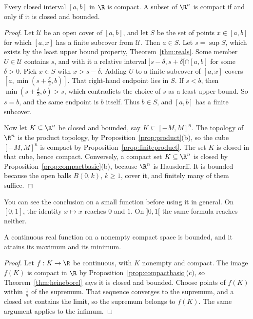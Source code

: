 \begin{theorem}\label{thm:heineborel}
Every closed interval $[a,b]$ in $\R$ is compact. A subset of $\R^n$ is compact if and only if it is closed and bounded.
\end{theorem}
\begin{proof}
Let $\mathcal U$ be an open cover of $[a,b]$, and let $S$ be the set of points $x\in[a,b]$ for which $[a,x]$ has a finite subcover from $\mathcal U$. Then $a\in S$. Let $s=\sup S$, which exists by the least upper bound property, Theorem~\ref{thm:reals}. Some member $U\in\mathcal U$ contains $s$, and with it a relative interval $]s-\delta,s+\delta[\cap[a,b]$ for some $\delta>0$. Pick $x\in S$ with $x>s-\delta$. Adding $U$ to a finite subcover of $[a,x]$ covers $[a,\min(s+\frac\delta2,b)]$. That right-hand endpoint lies in $S$. If $s<b$, then $\min(s+\frac\delta2,b)>s$, which contradicts the choice of $s$ as a least upper bound. So $s=b$, and the same endpoint is $b$ itself. Thus $b\in S$, and $[a,b]$ has a finite subcover.

Now let $K\subseteq\R^n$ be closed and bounded, say $K\subseteq[-M,M]^n$. The topology of $\R^n$ is the product topology, by Proposition~\ref{prop:product}(b), so the cube $[-M,M]^n$ is compact by Proposition~\ref{prop:finiteproduct}. The set $K$ is closed in that cube, hence compact. Conversely, a compact set $K\subseteq\R^n$ is closed by Proposition~\ref{prop:compactbasic}(b), because $\R^n$ is Hausdorff. It is bounded because the open balls $B(0,k)$, $k\ge1$, cover it, and finitely many of them suffice.
\end{proof}

You can see the conclusion on a small function before using it in general. On $[0,1]$, the identity $x\mapsto x$ reaches $0$ and $1$. On $]0,1[$ the same formula reaches neither.

\begin{corollary}\label{cor:extreme}
A continuous real function on a nonempty compact space is bounded, and it attains its maximum and its minimum.
\end{corollary}
\begin{proof}
Let $f:K\to\R$ be continuous, with $K$ nonempty and compact. The image $f(K)$ is compact in $\R$ by Proposition~\ref{prop:compactbasic}(c), so Theorem~\ref{thm:heineborel} says it is closed and bounded. Choose points of $f(K)$ within $\frac1n$ of the supremum. That sequence converges to the supremum, and a closed set contains the limit, so the supremum belongs to $f(K)$. The same argument applies to the infimum.
\end{proof}

